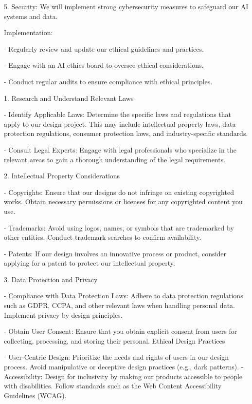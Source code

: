 \documentclass[12pt,letterpaper]{article}
\begin{document}
5. Security: We will implement strong cybersecurity measures to safeguard our AI systems and data.


Implementation:

- Regularly review and update our ethical guidelines and practices.

- Engage with an AI ethics board to oversee ethical considerations.

- Conduct regular audits to ensure compliance with ethical principles.



 1. Research and Understand Relevant Laws

- Identify Applicable Laws: Determine the specific laws and regulations that apply to our design project. This may include intellectual property laws, data protection regulations, consumer protection laws, and industry-specific standards.

- Consult Legal Experts: Engage with legal professionals who specialize in the relevant areas to gain a thorough understanding of the legal requirements.

 2. Intellectual Property Considerations

- Copyrights: Ensure that our designs do not infringe on existing copyrighted works. Obtain necessary permissions or licenses for any copyrighted content you use.

- Trademarks: Avoid using logos, names, or symbols that are trademarked by other entities. Conduct trademark searches to confirm availability.

- Patents: If our design involves an innovative process or product, consider applying for a patent to protect our intellectual property.

 3. Data Protection and Privacy

- Compliance with Data Protection Laws: Adhere to data protection regulations such as GDPR, CCPA, and other relevant laws when handling personal data. Implement privacy by design principles.

- Obtain User Consent: Ensure that you obtain explicit consent from users for collecting, processing, and storing their personal. Ethical Design Practices

- User-Centric Design: Prioritize the needs and rights of users in our design process. Avoid manipulative or deceptive design practices (e.g., dark patterns).
- Accessibility: Design for inclusivity by making our products accessible to people with disabilities. Follow standards such as the Web Content Accessibility Guidelines (WCAG).
\end{document}

